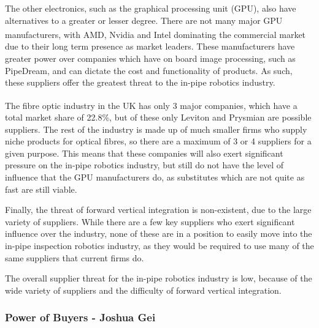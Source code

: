 \documentclass[11pt]{article}		%
\newcommand{\supercite}[1]{\textsuperscript{\cite{#1}}}		%
\begin{document}
				The other electronics, such as the graphical processing unit (GPU), also have alternatives to a greater or lesser degree.
				There are not many major GPU manufacturers, with AMD, Nvidia and Intel dominating the commercial market\supercite{rake2020graphic} due to their long term presence as market leaders.
				These manufacturers have greater power over companies which have on board image processing, such as PipeDream, and can dictate the cost and functionality of  products.
				As such, these suppliers offer the greatest threat to the in-pipe robotics industry.
				
				The fibre optic industry in the UK has only 3 major companies\supercite{neve2020fibreoptic}, which have a total market share of 22.8\%, but of these only Leviton and Prysmian are possible suppliers.
				The rest of the industry is made up of much smaller firms who supply niche products for optical fibres, so there are a maximum of 3 or 4 suppliers for a given purpose.
				This means that these companies will also exert significant pressure on the in-pipe robotics industry, but still do not have the level of influence that the GPU manufacturers do, as substitutes which are not quite as fast are still viable.
				
				Finally, the threat of forward vertical integration is non-existent, due to the large variety of suppliers.
				While there are a few key suppliers who exert significant influence over the industry, none of these are in a position to easily move into the in-pipe inspection robotics industry, as they would be required to use many of the same suppliers that current firms do.
				
				The overall supplier threat for the in-pipe robotics industry is low, because of the wide variety of suppliers and the difficulty of forward vertical integration.
				
		    \subsubsection{Power of Buyers - Joshua Gei}
			
\end{document}
